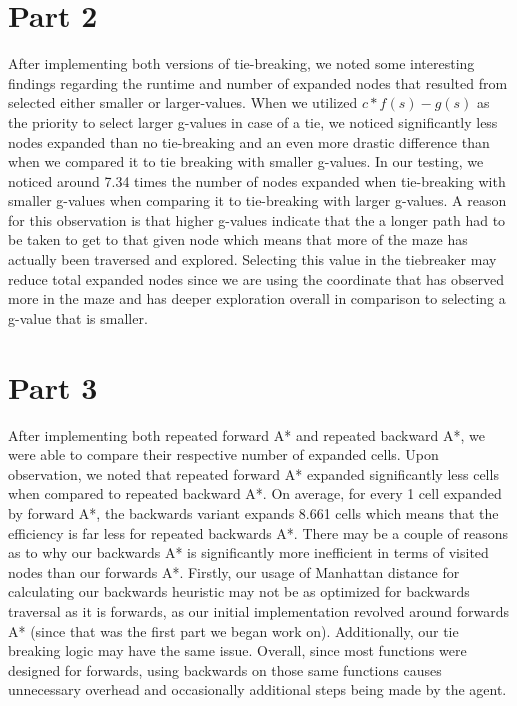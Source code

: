 \documentclass{article}
\begin{document}
\section*{Part 2}
After implementing both versions of tie-breaking, we noted some interesting findings regarding the runtime and number of expanded nodes that resulted from selected either smaller or larger-values. When we utilized $ c * f (s) - g(s) $ as the priority to select larger g-values in case of a tie, we noticed significantly less nodes expanded than no tie-breaking and an even more drastic difference than when we compared it to tie breaking with smaller g-values. In our testing, we noticed around 7.34 times the number of nodes expanded when tie-breaking with smaller g-values when comparing it to tie-breaking with larger g-values. A reason for this observation is that higher g-values indicate that the a longer path had to be taken to get to that given node which means that more of the maze has actually been traversed and explored. Selecting this value in the tiebreaker may reduce total expanded nodes since we are using the coordinate that has observed more in the maze and has deeper exploration overall in comparison to selecting a g-value that is smaller.

\section*{Part 3}
After implementing both repeated forward A* and repeated backward A*, we were able to compare their respective number of expanded cells. Upon observation, we noted that repeated forward A* expanded significantly less cells when compared to repeated backward A*. On average, for every 1 cell expanded by forward A*, the backwards variant expands 8.661 cells which means that the efficiency is far less for repeated backwards A*. There may be a couple of reasons as to why our backwards A* is significantly more inefficient in terms of visited nodes than our forwards A*. Firstly, our usage of Manhattan distance for calculating our backwards heuristic may not be as optimized for backwards traversal as it is forwards, as our initial implementation revolved around forwards A* (since that was the first part we began work on). Additionally, our tie breaking logic may have the same issue. Overall, since most functions were designed for forwards, using backwards on those same functions causes unnecessary overhead and occasionally additional steps being made by the agent.
\end{document}
